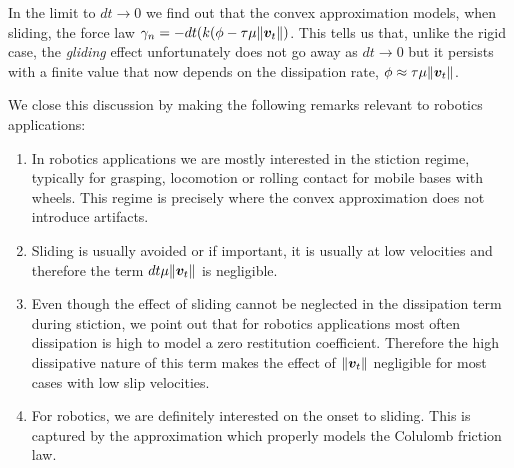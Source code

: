 In the limit to $dt\rightarrow 0$ we find out that the convex approximation
models, when sliding, the force law
$\gamma_n=-dt(k(\phi-\tau\mu\Vert{\bm{v}}_t\Vert)$. This tells us that, unlike the
rigid case, the \textit{gliding} effect unfortunately does not go away as
$dt\rightarrow 0$ but it persists with a finite value that now depends on the
dissipation rate, $\phi\approx\tau\mu\Vert{\bm{v}}_t\Vert$.

We close this discussion by making the following remarks relevant to robotics
applications:
\begin{enumerate}
	\item In robotics applications we are mostly interested in the stiction
	regime, typically for grasping, locomotion or rolling contact for mobile
	bases with wheels. This regime is precisely where the convex approximation
	does not introduce artifacts.
	\item Sliding is usually avoided or if important, it is usually at low
	velocities and therefore the term $dt\mu\Vert{\bm{v}}_t\Vert$ is negligible.
	\item Even though the effect of sliding cannot be neglected in the
	dissipation term during stiction, we point out that for robotics
	applications most often dissipation is high to model a zero restitution
	coefficient. Therefore the high dissipative nature of this term makes the
	effect of $\Vert{\bm{v}}_t\Vert$ negligible for most cases with low slip
	velocities.
	\item For robotics, we are definitely interested on the onset to sliding.
	This is captured by the approximation which properly models the Colulomb
	friction law.
\end{enumerate}
